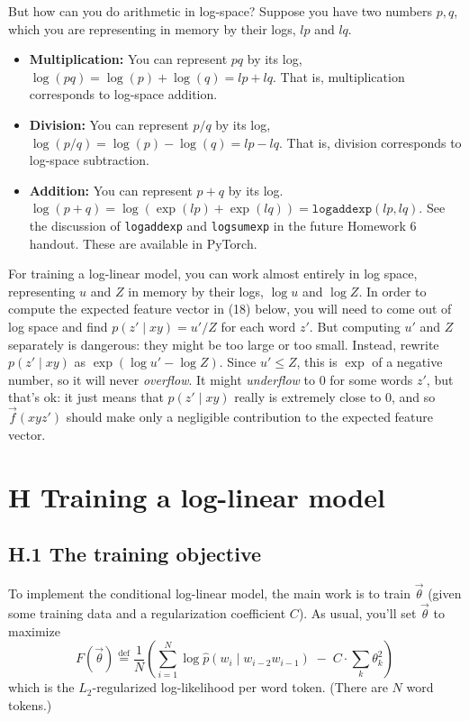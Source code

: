 \documentclass[12pt]{article}
\theoremstyle{plain}
\theoremstyle{definition}
\theoremstyle{remark}
\begin{document}
But how can you do arithmetic in log-space? Suppose you have two numbers $p, q$, which you are representing in memory by their logs, $lp$ and $lq$.  

\begin{itemize}
    \item \textbf{Multiplication:} You can represent $pq$ by its log, $\log(pq) = \log(p) + \log(q) = lp + lq$. That is, multiplication corresponds to log-space addition.

    \item \textbf{Division:} You can represent $p/q$ by its log, $\log(p/q) = \log(p) - \log(q) = lp - lq$. That is, division corresponds to log-space subtraction.

    \item \textbf{Addition:} You can represent $p+q$ by its log. $\log(p+q) = \log(\exp(lp)+\exp(lq)) = \texttt{logaddexp}(lp,lq)$. See the discussion of \texttt{logaddexp} and \texttt{logsumexp} in the future Homework 6 handout. These are available in PyTorch.
\end{itemize}

For training a log-linear model, you can work almost entirely in log space, representing $u$ and $Z$ in memory by their logs, $\log u$ and $\log Z$. In order to compute the expected feature vector in (18) below, you will need to come out of log space and find $p(z' \mid xy) = u'/Z$ for each word $z'$. But computing $u'$ and $Z$ separately is dangerous: they might be too large or too small. Instead, rewrite $p(z' \mid xy)$ as $\exp(\log u' - \log Z)$. Since $u' \leq Z$, this is $\exp$ of a negative number, so it will never \emph{overflow}. It might \emph{underflow} to 0 for some words $z'$, but that’s ok: it just means that $p(z' \mid xy)$ really is extremely close to 0, and so $\vec{f}(xyz')$ should make only a negligible contribution to the expected feature vector.

\section*{H Training a log-linear model}

\subsection*{H.1 The training objective}

To implement the conditional log-linear model, the main work is to train $\vec{\theta}$ (given some training data and a regularization coefficient $C$). As usual, you’ll set $\vec{\theta}$ to maximize
\begin{equation}
F(\vec{\theta}) \stackrel{\text{def}}{=} \frac{1}{N} \left( \sum_{i=1}^N \log \hat{p}(w_i \mid w_{i-2} w_{i-1}) \;-\; C \cdot \sum_k \theta_k^2 \right)
\end{equation}
which is the $L_2$-regularized log-likelihood per word token. (There are $N$ word tokens.)
\end{document}
